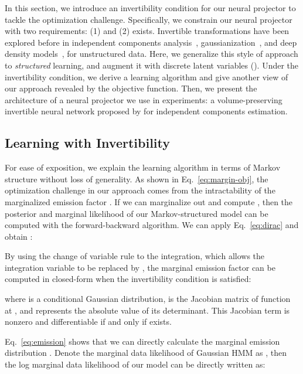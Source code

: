 \documentclass[11pt,a4paper]{article}
\begin{document}
In this section, we introduce an invertibility condition for our neural projector to tackle the optimization challenge. Specifically, we constrain our neural projector with two requirements: (1)  and (2)  exists. Invertible transformations have been explored before in independent components analysis~\citep{hyvarinen2004independent}, gaussianization~\citep{chen2001gaussianization}, and deep density models~\citep{dinh2014nice, dinh2016density, kingma2018glow}, for unstructured data. Here, we generalize this style of approach to \emph{structured} learning, and augment it with discrete latent variables (). Under the invertibility condition, we derive a learning algorithm and give another view of our approach revealed by the objective function. Then, we present the architecture of a neural projector we use in experiments: a volume-preserving invertible neural network proposed by \citet{dinh2014nice} for independent components estimation.



\subsection{Learning with Invertibility}
\label{sec:learn-with-inv}
For ease of exposition, we explain the learning algorithm in terms of Markov structure without loss of generality. As shown in Eq.~\eqref{eq:margin-obj}, the optimization challenge in our approach comes from the intractability of the marginalized emission factor . If we can marginalize out  and compute , 
then the posterior and marginal likelihood of our Markov-structured model can be computed with the forward-backward algorithm.  We can apply Eq.~\eqref{eq:dirac} and obtain : 

By using the change of variable rule to the integration, which allows the integration variable  to be replaced by , the marginal emission factor can be computed in closed-form when the invertibility condition is satisfied:

where  is a conditional Gaussian distribution,  is the Jacobian matrix of function  at , and  represents the absolute value of its determinant. This Jacobian term is nonzero and differentiable if and only if  exists.

Eq.~\eqref{eq:emission} shows that we can directly calculate the marginal emission distribution .
Denote the marginal data likelihood of Gaussian HMM as , then the log marginal data likelihood of our model can be directly written as:
\end{document}
